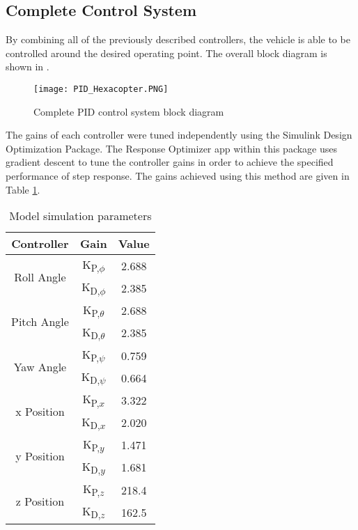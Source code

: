\FloatBarrier
\subsection{Complete Control System}
By combining all of the previously described controllers, the vehicle is able to be controlled around the desired operating point. The overall block diagram is shown in . 
\begin{figure}[htb]
	\texttt{[image: PID\_Hexacopter.PNG]}%
	\caption{Complete PID control system block diagram}%
	\label{fig:PID_Hexacopter}%
\end{figure}

The gains of each controller were tuned independently using the Simulink Design Optimization Package. The Response Optimizer app within this package uses gradient descent to tune the controller gains in order to achieve the specified performance of step response. The gains achieved using this method are given in Table \ref{table:PID_Gains}.
\begin{table}[htb]\label{table:PID_Gains}
\begin{center}
\begin{tabular}{||c|c|c||} 
 \hline
 Controller & Gain & Value\\ [0.5ex] 
 \hline\hline
 \multirow{2}{7em}{Roll Angle}& K\textsubscript{P,$\phi$} & 2.688 \\ 
 \cline{2-3}
  &K\textsubscript{D,$\phi$} & 2.385 \\
 \hline
  \multirow{2}{7em}{Pitch Angle}& K\textsubscript{P,$\theta$} & 2.688 \\
 \cline{2-3}
  &K\textsubscript{D,$\theta$} & 2.385 \\
 \hline
 \multirow{2}{7em}{Yaw Angle}& K\textsubscript{P,$\psi$} & 0.759 \\
 \cline{2-3}
 &K\textsubscript{D,$\psi$} & 0.664 \\
 \hline
 \multirow{2}{7em}{x Position}& K\textsubscript{P,$x$} & 3.322 \\
 \cline{2-3}
 &K\textsubscript{D,$x$} & 2.020 \\
 \hline
 \multirow{2}{7em}{y Position}& K\textsubscript{P,$y$} & 1.471 \\
 \cline{2-3}
 &K\textsubscript{D,$y$} & 1.681 \\
 \hline
 \multirow{2}{7em}{z Position}& K\textsubscript{P,$z$} & 218.4 \\
 \cline{2-3}
 &K\textsubscript{D,$z$} & 162.5 \\
 \hline
\end{tabular}
\caption{Model simulation parameters}
\end{center}
\end{table}

